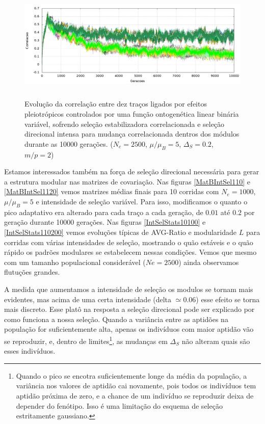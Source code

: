 \begin{center}
\begin{figure}[htbp]
  \includegraphics[width=150mm, height=55mm]{figuras/direcionalRMu5Ne2500IntSel200.png}
  \caption{Evolução da correlação entre dez traços ligados por efeitos
  pleiotrópicos controlados por uma função ontogenética linear binária
  variável, sofrendo seleção estabilizadora correlacionada
  e seleção direcional intensa para mudança correlacionada dentros dos
  módulos durante as 10000 gerações. 
  ($N_e = 2500$, $\mu/\mu_B=5$, $\Delta_S=0.2$, $m/p=2$)}
  \label{MatBDirecionalNe2500RMu5}
\end{figure}
\end{center}

Estamos interessados também na força de seleção direcional necessária
para gerar a estrutura modular nas matrizes de covariação. 
Nas figuras \ref{MatBIntSel110} e \ref{MatBIntSel1120} vemos matrizes
médias finais para 10 corridas com $N_e = 1000$, $\mu/\mu_B=5$ e
intensidade de seleção variável. 
Para isso, modificamos o quanto o pico adaptativo era alterado para cada
traço a cada geração, de $0.01$ até $0.2$ por geração durante 10000
gerações. 
Nas figuras \ref{IntSelStats10100} e \ref{IntSelStats110200} vemos
evoluções típicas de AVG-Ratio e modularidade $L$ para corridas com
várias intensidades de seleção, mostrando o quão estáveis e o quão
rápido os padrões modulares se estabelecem nessas condições.
Vemos que mesmo com um tamanho populacional considerável ($Ne = 2500$)
ainda observamos flutuções grandes. 

A medida que aumentamos a intensidade de seleção os modulos se tornam
mais evidentes, mas acima de uma certa intensidade (delta $\simeq 0.06$)
esse efeito se torna mais discreto. 
Esse platô na resposta a seleção direcional pode ser explicado por como
funciona a nossa seleção. 
Quando a variância entre as aptidões na população for suficientemente
alta, apenas os indivíduos com maior aptidão vão se reproduzir, e,
dentro de limites\footnote{ Quando o pico se encotra suficientemente
longe da média da população, a variância nos valores de aptidão cai
novamente, pois todos os indivíduos tem aptidão próxima de zero, e a
chance de um indivíduo se reproduzir deixa de depender do fenótipo. 
Isso é uma limitação do esquema de seleção estritamente gaussiano.}, as
mudanças em $\Delta_S$ não alteram quais são esses indivíduos. 

